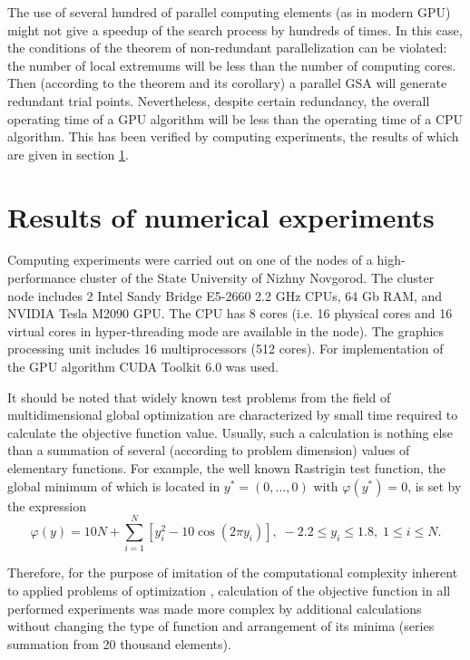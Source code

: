 \documentclass[smallcondensed]{svjour3}     %
\begin{document}
The use of several hundred of parallel computing elements (as in modern GPU) might not give a speedup of the search process by hundreds of times. In this case, the conditions of the theorem of non-redundant parallelization can be violated: the number of local extremums will be less than the number of computing cores. Then (according to the theorem and its corollary) a parallel GSA will generate redundant trial points. Nevertheless, despite certain redundancy, the overall operating time of a GPU algorithm will be less than the operating time of a CPU algorithm. This has been verified by computing experiments, the results of which are given in section \ref{sec:6}.

\section{Results of numerical experiments} \label{sec:6}

Computing experiments were carried out on one of the nodes of a high-performance cluster of the State University of Nizhny Novgorod. The cluster node includes 2 Intel Sandy Bridge E5-2660 2.2 GHz CPUs, 64 Gb RAM, and NVIDIA Tesla M2090 GPU. The CPU has 8 cores (i.e. 16 physical cores and 16 virtual cores in hyper-threading mode are available in the node). The graphics processing unit includes 16 multiprocessors (512 cores). For implementation of the GPU algorithm CUDA Toolkit 6.0 was used.

It should be noted that widely known test problems from the field of multidimensional global optimization are characterized by small time required to calculate the objective function value. Usually, such a calculation is nothing else than a summation of several (according to problem dimension) values of elementary functions. For example, the well known Rastrigin test function, the global minimum of which is located in $y^\ast = (0,\dots,0)$ with $\varphi(y^\ast)=0$, is set by the expression
\begin{equation}\label{eq:33}
\varphi(y)=10N+\sum^{N}_{i=1}\left[y^2_i-10\cos(2\pi y_i)\right], \; -2.2\leq y_i \leq 1.8, \; 1\leq i \leq N.
\end{equation}

Therefore, for the purpose of imitation of the computational complexity inherent to applied problems of optimization \cite{RefBarkalov2013}, calculation of the objective function in all performed experiments was made more complex by additional calculations without changing the type of function and arrangement of its minima (series summation from 20 thousand elements).
\end{document}
